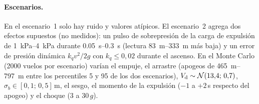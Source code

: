 \paragraph{Escenarios.} En el escenario~1 solo hay ruido y valores atípicos. El
escenario~2 agrega dos efectos supuestos (no medidos): un pulso de sobrepresión de la carga
de expulsión de \SIrange{1}{4}{kPa} durante \SIrange{0.05}{0.3}{s} (lectura \SIrange{83}{333}{m}
más baja) y un error de presión dinámica $k_q v^2/2g$ con $k_q\le0{,}02$ durante el ascenso.
En el Monte Carlo (\num{2000} vuelos por escenario) varían el empuje, el arrastre (apogeos de
\SIrange{465}{797}{m} entre los percentiles 5 y 95 de los dos escenarios),
$V_{\mathrm{d}}\sim\mathcal N(13{,}4;\,0{,}7)$, $\sigma_b\in[0{,}1;\,0{,}5]$\,m, el sesgo, el momento de la expulsión ($-1$ a $+2$\,s respecto
del apogeo) y el choque (3 a $30\,g$).

